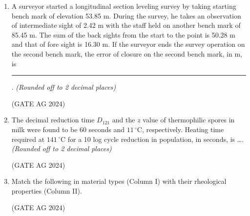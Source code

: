 \documentclass[journal]{IEEEtran}
\begin{document}
\begin{enumerate}
\medskip

\item 
A surveyor started a longitudinal section leveling survey by taking starting bench mark of elevation 53.85 m. During the survey, he takes an observation of intermediate sight of 2.42 m with the staff held on another bench mark of 85.45 m. The sum of the back sights from the start to the point is 50.28 m and that of fore sight is 16.30 m. If the surveyor ends the survey operation on the second bench mark, the error of closure on the second bench mark, in m, is \rule{4cm}{0.15mm}. \textit{(Rounded off to 2 decimal places)}

\begin{enumerate}
\end{enumerate}
 \hfill(GATE AG 2024)\\

 \medskip

\item 
The decimal reduction time $D_{121}$ and the $z$ value of thermophilic spores in milk were found to be 60 seconds and $11\,^\circ\mathrm{C}$, respectively. Heating time required at $141\,^\circ\mathrm{C}$ for a 10 log cycle reduction in population, in seconds, is \dots.\\
\textit{(Rounded off to 2 decimal places)}

\begin{enumerate}
\end{enumerate}
 \hfill(GATE AG 2024)\\

 \medskip

\item 
Match the following in material types (Column I) with their rheological properties (Column II).



\begin{enumerate}
\end{enumerate}
 \hfill(GATE AG 2024)\\


\end{enumerate}
\end{document}

